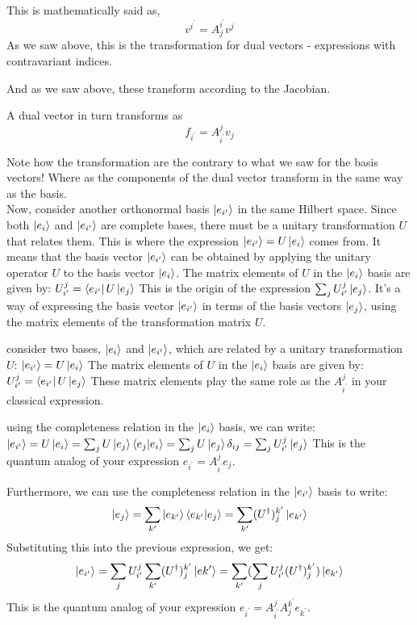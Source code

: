 This is mathematically said as,
$$
v^{i^\prime} = A^{i^\prime}_{j} v^j
$$
As we saw above, this is the transformation for dual vectors - expressions with contravariant indices.

And as we saw above, these transform according to the Jacobian.

A dual vector in turn transforms as
$$
f_{i^\prime} = A_{i^\prime}^{j} v_j
$$

Note how the transformation are the contrary to what we saw for the basis vectors!
Where as the components of the dual vector transform in the same way as the basis.
\\


Now, consider another orthonormal basis ${\ket{e_{i^{\prime}}}}$ in the same Hilbert space. Since both
${\ket{e_i}}$ and ${\ket{e_{i^{\prime}}}}$ are complete bases, there must be a unitary transformation $U$
that relates them. This is where the expression $\ket{e_{i^{\prime}}} = U \ket{e_i}$ comes from. It means
that the basis vector $\ket{e_{i^{\prime}}}$ can be obtained by applying the unitary operator $U$ to the
basis vector $\ket{e_i}$.
The matrix elements of $U$ in the $\ket{e_i}$ basis are given by:
$U_{i^{\prime}}^{j} = \bra{e_{i^{\prime}}} U \ket{e_j}$
This is the origin of the expression $\sum_j U_{i^{\prime}}^{j} \ket{e_j}$. It's a way of expressing the
basis vector $\ket{e_{i^{\prime}}}$ in terms of the basis vectors $\ket{e_j}$, using the matrix elements of
the transformation matrix $U$.

consider two bases, $\ket{e_i}$ and $\ket{e_{i^{\prime}}}$, which are related by a unitary transformation $U$:
$\ket{e_{i^{\prime}}} = U \ket{e_i}$
The matrix elements of $U$ in the $\ket{e_i}$ basis are given by:
$U_{i^{\prime}}^{j} = \bra{e_{i^{\prime}}} U \ket{e_j}$
These matrix elements play the same role as the $A_{i^{\prime}}^{j}$ in your classical expression.

using the completeness relation in the $\ket{e_i}$ basis, we can write:
$\ket{e_{i^{\prime}}} = U \ket{e_i} = \sum_j U \ket{e_j} \braket{e_j | e_i} = \sum_j U \ket{e_j} \delta_{ij} = \sum_j U_{i^{\prime}}^{j} \ket{e_j}$
This is the quantum analog of your expression $e_{i^{\prime}} = A_{i^{\prime}}^{j} e_j$.

Furthermore, we can use the completeness relation in the $\ket{e_{i^{\prime}}}$ basis to write:
$$
\ket{e_j} = \sum_{k^{\prime}} \ket{e_{k^{\prime}}} \braket{ e_{k^{\prime}} | e_j} = \sum_{k^{\prime}} (U^{\dagger})_{j}^{k^{\prime}} \ket{e_{k^{\prime}}}
$$
Substituting this into the previous expression, we get:
$$
\ket{e_{i^{\prime}}} = \sum_j U_{i^{\prime}}^{j} \sum_{k^{\prime}} (U^{\dagger})_{j}^{k^{\prime}} \ket{e{k^{\prime}}} = \sum_{k^{\prime}} (\sum_j U_{i^{\prime}}^{j} (U^{\dagger})_{j}^{k^{\prime}}) \ket{e_{k^{\prime}}}
$$
This is the quantum analog of your expression $e_{i^{\prime}} = A_{i^{\prime}}^{j} A_{j}^{k^{\prime}} e_{k^{\prime}}$.



